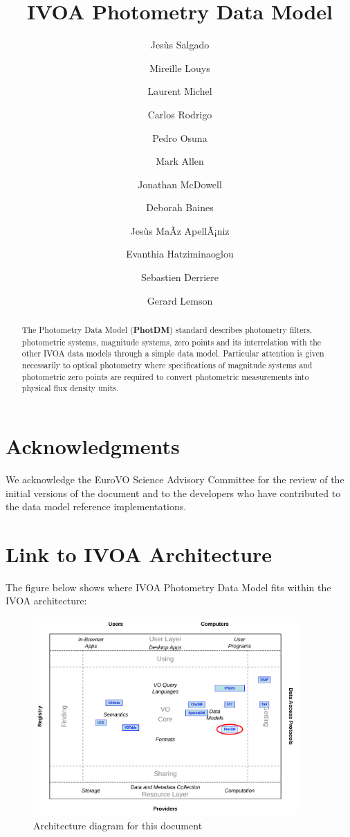\documentclass[11pt,a4paper]{ivoa}
\title{IVOA Photometry Data Model}
\author{Jesùs Salgado}
\author{Mireille Louys}
\author{Laurent Michel}
\author{Carlos Rodrigo}
\author{Pedro Osuna}
\author{Mark Allen}
\author{Jonathan McDowell}
\author{Deborah Baines}
\author{Jesùs MaÃ­z ApellÃ¡niz}
\author{Evanthia Hatziminaoglou}
\author{Sebastien \mbox{Derriere}}
\author{Gerard Lemson}
\begin{document}
\begin{abstract}
The Photometry Data Model (\textbf{PhotDM}) standard describes photometry filters, photometric systems, magnitude systems, zero points and its interrelation with the other IVOA data models through a simple data model. Particular attention is given necessarily to optical photometry where specifications of magnitude systems and photometric zero points are required to convert photometric measurements into physical flux density units.
\end{abstract}

\section*{Acknowledgments}
We acknowledge the EuroVO Science Advisory Committee for the review of the initial versions of the document and to the developers who have contributed to the data model reference implementations.
\pagebreak

\section*{Link to IVOA Architecture}
The figure below shows where IVOA Photometry Data Model fits within the IVOA architecture:



\begin{figure}[H] 
\centering


\includegraphics[width=0.9\textwidth]{role_diagram.pdf}
\caption{Architecture diagram for this document}
\label{fig:archdiag}
\end{figure}
\end{document}
